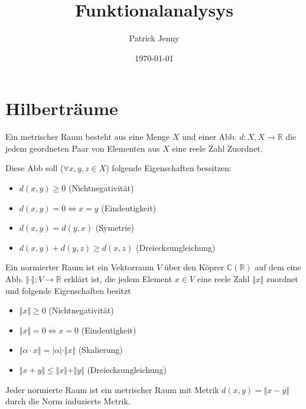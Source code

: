 \documentclass{physikprotokoll}
\title{Funktionalanalysys}
\author{Patrick Jenny}
\date{\today}
\begin{document}
	\maketitle
	
	\tableofcontents
	\newpage
	
	\section{Hilberträume}


	\begin{Def}
		Ein metrischer Raum besteht aus eine Menge $X$ und einer Abb. $d: X,X\rightarrow \mathbb{R}$
		die jedem geordneten Paar von Elementen aus $X$ eine reele Zahl Zuordnet.

		Diese Abb soll ($\forall x,y,z \in X$) folgende Eigenschaften bessitzen:

		\begin{itemize}
			\item $d(x,y) \geq 0$ (Nichtnegativität)
			\item $d(x,y) = 0 \Leftrightarrow x = y$ (Eindeutigkeit)
			\item $d(x,y) = d(y,x)$ (Symetrie)
			\item $d(x,y) + d(y,z) \geq d(x,z)$ (Dreiecksungleichung)
		\end{itemize}
	\end{Def}
	
	\begin{Def}
		Ein normierter Raum ist ein Vektorraum $V$ über den Köprer $\mathbb{C} (\mathbb{R})$
		auf dem eine Abb. $\Vert\cdot\Vert: V \rightarrow \mathbb{R}$ erklärt ist, die jedem
		Element $x \in V$ eine reele Zahl $\Vert x \Vert$ zuordnet und folgende Eigenschaften
		besitzt
		\begin{itemize}
			\item $\Vert x \Vert \geq 0$ (Nichtnegativität)
			\item $\Vert x \Vert = 0 \Leftrightarrow x = 0$ (Eindeutigkeit)
			\item $\Vert \alpha \cdot x \Vert = \vert \alpha \vert \cdot \Vert x \Vert$ (Skalierung)
			\item $\Vert x + y\Vert \leq \Vert x \Vert + \Vert y \Vert$ (Dreiecksungleichung)
		\end{itemize}
	\end{Def}

	\begin{Bem}
		Jeder normierte Raum ist ein metrischer Raum mit Metrik $d(x,y) = \Vert x-y \Vert$
		durch die Norm induzierte Metrik. 
	\end{Bem}
\end{document}

